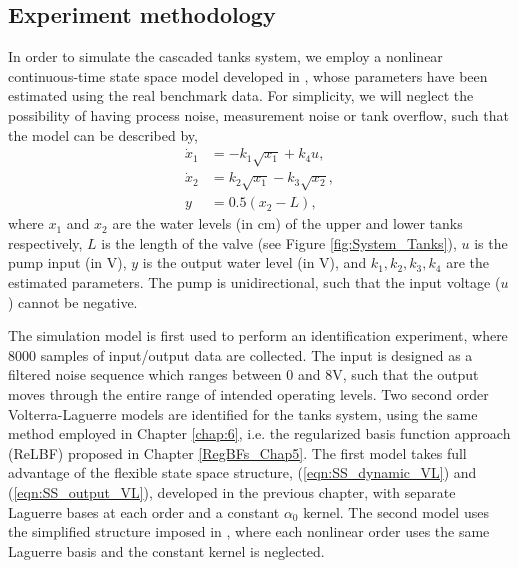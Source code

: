 \subsection{Experiment methodology}

In order to simulate the cascaded tanks system, we employ a nonlinear continuous-time state space model developed in \cite{Pan2018}, whose parameters have been estimated using the real benchmark data. For simplicity, we will neglect the possibility of having process noise, measurement noise or tank overflow, such that the model can be described by,
\begin{align}
\dot{x}_1 &= -k_1 \sqrt{x_1} + k_4 u, \\
\dot{x}_2 &= k_2 \sqrt{x_1} - k_3 \sqrt{x_2}, \\
y &= 0.5(x_2 - L),
\end{align}
where $x_1$ and $x_2$ are the water levels (in cm) of the upper and lower tanks respectively, $L$ is the length of the valve (see Figure \ref{fig:System_Tanks}), $u$ is the pump input (in V), $y$ is the output water level (in V), and $k_1, k_2, k_3, k_4$ are the estimated parameters. The pump is unidirectional, such that the input voltage ($u$) cannot be negative.

The simulation model is first used to perform an identification experiment, where $8000$ samples of input/output data are collected. The input is designed as a filtered noise sequence which ranges between 0 and 8V, such that the output moves through the entire range of intended operating levels. Two second order Volterra-Laguerre models are identified for the tanks system, using the same method employed in Chapter \ref{chap:6}, i.e. the regularized basis function approach (ReLBF) proposed in Chapter \ref{RegBFs_Chap5}. The first model takes full advantage of the flexible state space structure, (\ref{eqn:SS_dynamic_VL}) and (\ref{eqn:SS_output_VL}), developed in the previous chapter, with separate Laguerre bases at each order and a constant $\alpha_0$ kernel. The second model uses the simplified structure imposed in \cite{Parker1998}, where each nonlinear order uses the same Laguerre basis and the constant kernel is neglected. 

